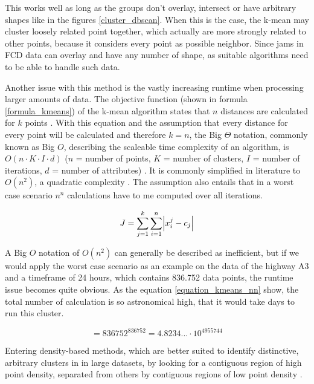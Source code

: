 \documentclass[a4paper,12pt]{report}
\begin{document}
This works well as long as the groups don't overlay, intersect or have arbitrary shapes like in the figures \ref{cluster_dbscan}. When this is the case, the k-mean may cluster loosely related point together, which actually are more strongly related to other points, because it considers every point as possible neighbor. Since jams in FCD data can overlay and have any number of shape, as suitable algorithms need to be able to handle such data.

Another issue with this method is the vastly increasing runtime when processing larger amounts of data. The objective function (shown in formula \ref{formula_kmeans}) of the k-mean algorithm states that $n$ distances are calculated for $k$ points \cite{Santhanam2010}. With this equation and the assumption that every distance for every point will be calculated and therefore $k=n$, the Big $\Theta$ notation, commonly known as Big $O$, describing the scaleable time complexity of an algorithm, is $O(n \cdot K \cdot I \cdot d)$ ($n$ = number of points, $K$ = number of clusters, $I$ = number of iterations, $d$ = number of attributes) \cite{Dalatu2016}. It is commonly simplified in literature to $O(n^2)$, a quadratic complexity \cite{Pakhira2014}. The assumption also entails that in a worst case scenario $n^n$ calculations have to me computed over all iterations.

\begin{equation}
\label{formula_kmeans}
	J =  \sum_{j=1}^k{\sum_{i=1}^n{\abs{x_i^j-c_j}}}
\end{equation}

\bigskip

A Big $O$ notation of $O(n^2)$ can generally be described as inefficient, but if we would apply the worst case scenario as an example on the data of the highway A3 and a timeframe of 24 hours, which contains 836.752 data points, the runtime issue becomes quite obvious. As the equation \ref{equation_kmeans_nn} show, the total number of calculation is so astronomical high, that it would take days to run this cluster. \cite{Busch2004}

\begin{equation}
\label{equation_kmeans_nn}
	 = 836752^{836752} = 4.8234... \cdot 10^{4955744}
\end{equation}

\bigskip

Entering density-based methods, which are better suited to identify distinctive, arbitrary clusters in in large datasets, by looking for a contiguous region of high point density, separated from others by contiguous regions of low point density \cite{Chauhan2020}. 
\end{document}
